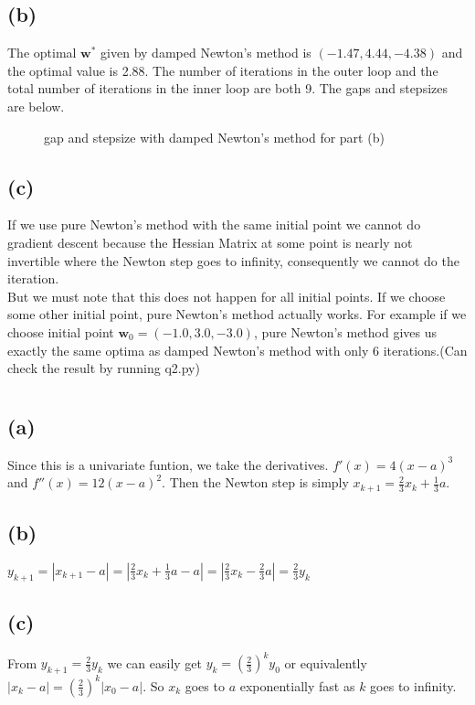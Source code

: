 \documentclass[12pt,letterpaper]{article}
\begin{document}
\subsection*{(b)}
The optimal $\boldsymbol{w}^*$ given by damped Newton's method is $(-1.47, 4.44, -4.38)$ and the optimal value is 2.88. The number of iterations in the outer loop and the total number of iterations in the inner loop are both 9. The gaps and stepsizes are below.
\begin{figure}[htbp]
\centering
{}
\caption{gap and stepsize with damped Newton's method for part (b)}
\label{2b}
\end{figure}

\subsection*{(c)}
If we use pure Newton's method with the same initial point we cannot do gradient descent because the Hessian Matrix at some point is nearly not invertible where the Newton step goes to infinity, consequently we cannot do the iteration. \\
But we must note that this does not happen for all initial points. If we choose some other initial point, pure Newton's method actually works. For example if we choose initial point $\boldsymbol{w}_0=(-1.0,3.0,-3.0)$, pure Newton's method gives us exactly the same optima as damped Newton's method with only 6 iterations.(Can check the result by running q2.py)

\section{}
\subsection*{(a)}
Since this is a univariate funtion, we take the derivatives. $f'(x)=4(x-a)^3$ and $f''(x)=12(x-a)^2$. Then the Newton step is simply $x_{k+1}=\frac{2}{3}x_{k}+\frac{1}{3}a$. 
\subsection*{(b)}
$y_{k+1}=|x_{k+1}-a|=|\frac{2}{3}x_k+\frac{1}{3}a-a|=|\frac{2}{3}x_k-\frac{2}{3}a|=\frac{2}{3}y_k$
\subsection*{(c)}
From $y_{k+1}=\frac{2}{3}y_{k}$ we can easily get $y_k=(\frac{2}{3})^{k}y_0$ or equivalently $|x_k-a|=(\frac{2}{3})^k|x_0-a|$. So $x_k$ goes to $a$ exponentially fast as $k$ goes to infinity.
\end{document}
